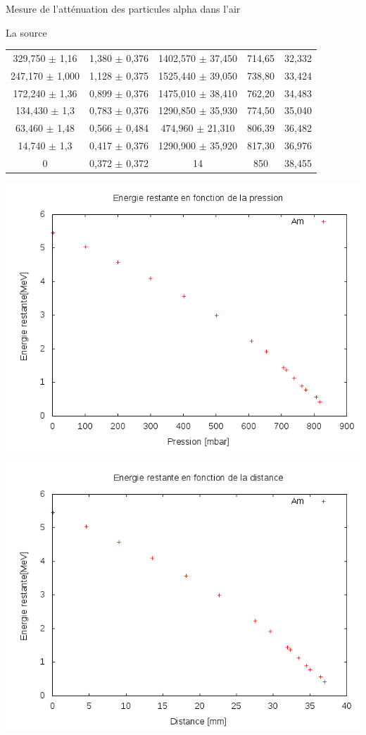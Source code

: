 \documentclass[a4paper,11pt]{scrartcl}
\begin{document}
\begin{section}{Mesure de l'atténuation des particules alpha dans l'air}
\begin{subsection}{La source }
\begin{center}
\begin{tabular}{c|c|c|c|c}
      329,750 $\pm$ 1,16	&1,380 $\pm$ 0,376	&1402,570 $\pm$ 37,450	&714,65	&32,332\\
      247,170 $\pm$ 1,000	&1,128 $\pm$ 0,375	&1525,440 $\pm$ 39,050	&738,80	&33,424\\
      172,240 $\pm$ 1,36	&0,899 $\pm$ 0,376	&1475,010 $\pm$ 38,410	&762,20	&34,483\\
      134,430 $\pm$ 1,3		&0,783 $\pm$ 0,376	&1290,850 $\pm$ 35,930	&774,50	&35,040\\
      63,460 $\pm$ 1,48		&0,566 $\pm$ 0,484	&474,960 $\pm$ 21,310	&806,39	&36,482\\
      14,740 $\pm$ 1,3		&0,417 $\pm$ 0,376	&1290,900 $\pm$ 35,920	&817,30	&36,976\\
      0				&0,372 $\pm$ 0,372	&14			&850	&38,455\\
     \end{tabular}
    \end{center}
    \begin{minipage}{0.45\textwidth}
     \includegraphics[width=\textwidth]{Sabine/am_pression.png}
    \end{minipage}
    \hfill
    \begin{minipage}{0.45\textwidth}
     \includegraphics[width=\textwidth]{Sabine/am_distance.png}

\end{minipage}
\end{subsection}
\end{section}
\end{document}
